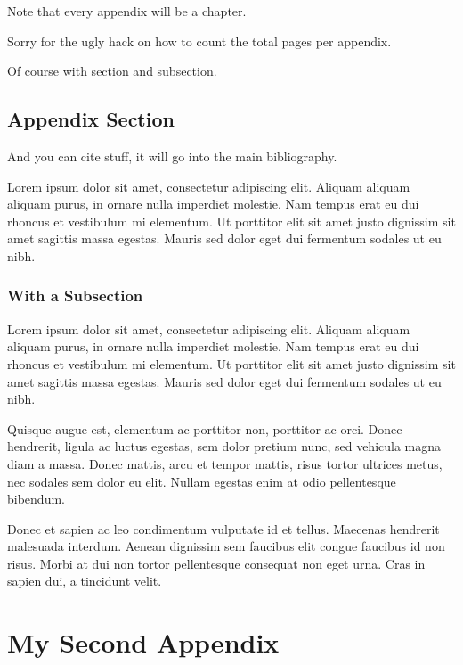 Note that every appendix will be a chapter.

Sorry for the ugly hack on how to count the total pages per appendix.


Of course with section and subsection.

\section{Appendix Section}

And you can cite \cite{tobias:book} stuff, it will go into the main bibliography.

Lorem ipsum dolor sit amet, consectetur adipiscing elit. Aliquam aliquam aliquam purus, in ornare nulla imperdiet molestie. Nam tempus erat eu dui rhoncus et vestibulum mi elementum. Ut porttitor elit sit amet justo dignissim sit amet sagittis massa egestas. Mauris sed dolor eget dui fermentum sodales ut eu nibh.

\subsection{With a Subsection}

Lorem ipsum dolor sit amet, consectetur adipiscing elit. Aliquam aliquam aliquam purus, in ornare nulla imperdiet molestie. Nam tempus erat eu dui rhoncus et vestibulum mi elementum. Ut porttitor elit sit amet justo dignissim sit amet sagittis massa egestas. Mauris sed dolor eget dui fermentum sodales ut eu nibh.

Quisque augue est, elementum ac porttitor non, porttitor ac orci. Donec hendrerit, ligula ac luctus egestas, sem dolor pretium nunc, sed vehicula magna diam a massa. Donec mattis, arcu et tempor mattis, risus tortor ultrices metus, nec sodales sem dolor eu elit. Nullam egestas enim at odio pellentesque bibendum. 

Donec et sapien ac leo condimentum vulputate id et tellus. Maecenas hendrerit malesuada interdum. Aenean dignissim sem faucibus elit congue faucibus id non risus. Morbi at dui non tortor pellentesque consequat non eget urna. Cras in sapien dui, a tincidunt velit.

\clearpage %
\chapter{My Second Appendix}\label{appx:second}

